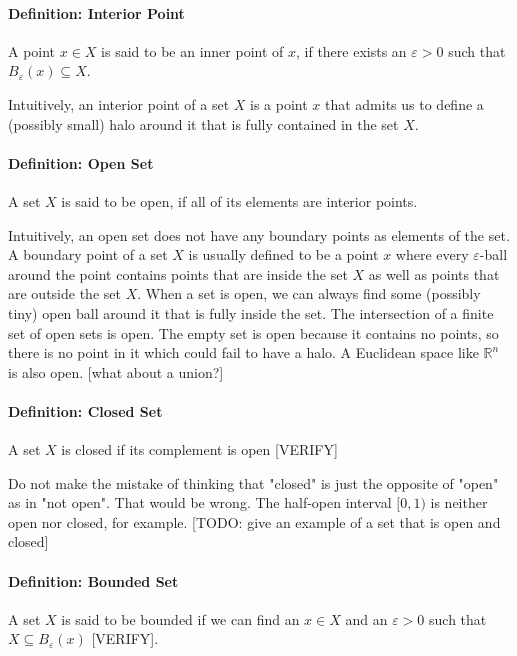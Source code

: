 \paragraph{Definition: Interior Point} A point $x \in X$ is said to be an inner point of $x$, if there exists an $\varepsilon > 0$ such that $B_\varepsilon(x) \subseteq X$. 


\medskip
Intuitively, an interior point of a set $X$ is a point $x$ that admits us to define a (possibly small) halo around it that is fully contained in the set $X$.

\paragraph{Definition: Open Set} A set $X$ is said to be open, if all of its elements are interior points. 

\medskip
Intuitively, an open set does not have any boundary points as elements of the set. A boundary point of a set $X$ is usually defined to be a point $x$ where every $\varepsilon$-ball around the point contains points that are inside the set $X$ as well as points that are outside the set $X$. When a set is open, we can always find some (possibly tiny) open ball around it that is fully inside the set. The intersection of a finite set of open sets is open. The empty set is open because it contains no points, so there is no point in it which could fail to have a halo. A Euclidean space like $\mathbb{R}^n$ is also open. [what about a union?]

\paragraph{Definition: Closed Set} A set $X$ is closed if its complement is open [VERIFY]

\medskip
Do not make the mistake of thinking that "closed" is just the opposite of "open" as in "not open". That would be wrong. The half-open interval $[0,1)$ is neither open nor closed, for example. [TODO: give an example of a set that is open and closed]

\paragraph{Definition: Bounded Set} A set $X$ is said to be bounded if we can find an $x \in X$ and an $\varepsilon > 0$ such that $X \subseteq B_\varepsilon(x)$ [VERIFY]. 

